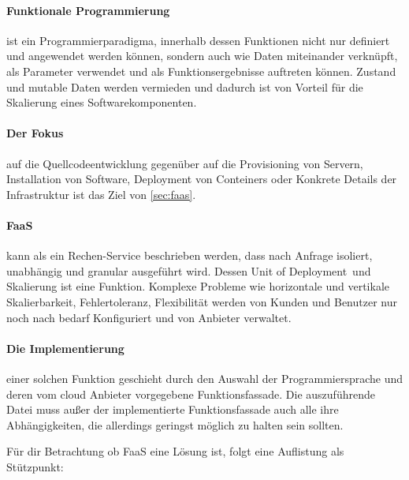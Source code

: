 \documentclass[
12pt,
english,
ngerman,
headsepline,
twoside,
openright,
numbers=noenddot,version=first
]{scrreprt}
\begin{document}
\paragraph{Funktionale Programmierung} ist ein Programmierparadigma, innerhalb dessen Funktionen nicht nur definiert und angewendet werden können, sondern auch wie Daten miteinander verknüpft, als Parameter verwendet und als Funktionsergebnisse auftreten können. Zustand und mutable Daten werden vermieden und dadurch ist von Vorteil für die Skalierung eines Softwarekomponenten.\cite{funcScala}

\paragraph{Der Fokus} auf die Quellcodeentwicklung gegenüber auf die Provisioning von Servern, Installation von Software, Deployment von Conteiners oder Konkrete Details der Infrastruktur ist das Ziel von \ref{sec:faas}.\\
\label{sec:faas}
\paragraph{\acrshort{FaaS}} kann als ein Rechen-Service beschrieben werden, dass nach Anfrage isoliert, unabhängig und granular ausgeführt wird. Dessen \glqq Unit of Deployment\grqq\ und Skalierung ist eine Funktion. 
Komplexe Probleme wie horizontale und vertikale Skalierbarkeit, Fehlertoleranz, Flexibilität werden von Kunden und Benutzer nur noch nach bedarf Konfiguriert und von Anbieter verwaltet\cite{patternAWS}.

\paragraph{Die Implementierung} einer solchen Funktion geschieht durch den Auswahl der Programmiersprache und deren vom cloud Anbieter vorgegebene Funktionsfassade. Die auszuführende Datei muss außer der implementierte Funktionsfassade auch alle ihre Abhängigkeiten, die allerdings geringst möglich zu halten sein sollten.


Für dir Betrachtung ob \acrshort{FaaS} eine Lösung ist, folgt eine Auflistung als Stützpunkt:\cite{lambdaAWS}
\end{document}

